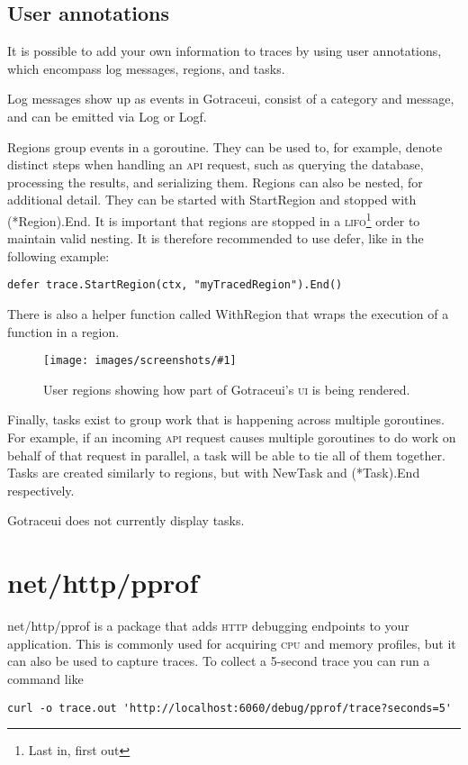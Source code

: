 \documentclass[10pt,letterpaper,oneside,openany,english]{memoir}
\newcommand{\code}[1]{{\ttfamily\mbox{#1}}}
\newcommand{\screenshot}[2]{%
\begin{figure}[!ht]
  \centering
  \texttt{[image: images/screenshots/\#1]}
  \caption{#2}
\end{figure}}
\begin{document}
\subsection{User annotations}
It is possible to add your own information to traces by using user annotations, which encompass log messages, regions, and tasks.

Log messages show up as events in Gotraceui, consist of a category and message, and can be emitted via \code{Log} or \code{Logf}.

Regions group events in a goroutine.
They can be used to, for example, denote distinct steps when handling an \textsc{api} request, such as querying the database, processing the results, and serializing them.
Regions can also be nested, for additional detail. They can be started with \code{StartRegion} and stopped with \code{(*Region).End}.
It is important that regions are stopped in a \textsc{lifo}\footnote{Last in, first out} order to maintain valid nesting.
It is therefore recommended to use \code{defer}, like in the following example:
\begin{verbatim}
defer trace.StartRegion(ctx, "myTracedRegion").End()
\end{verbatim}
There is also a helper function called \code{WithRegion} that wraps the execution of a function in a region.

\screenshot{user-regions.png}{User regions showing how part of Gotraceui's \textsc{ui} is being rendered.}

Finally, tasks exist to group work that is happening across multiple goroutines.
For example, if an incoming \textsc{api} request causes multiple goroutines to do work on behalf of that request in parallel, a task will be able to tie all of them together.
Tasks are created similarly to regions, but with \code{NewTask} and \code{(*Task).End} respectively.

Gotraceui does not currently display tasks.

\section{\code{net/http/pprof}}\label{net-http-pprof}

\code{net/http/pprof} is a package that adds \textsc{http} debugging endpoints to your application.
This is commonly used for acquiring \textsc{cpu} and memory profiles, but it can also be used to capture traces.
To collect a 5-second trace you can run a command like

\begin{verbatim}
curl -o trace.out 'http://localhost:6060/debug/pprof/trace?seconds=5'
\end{verbatim}
\end{document}
